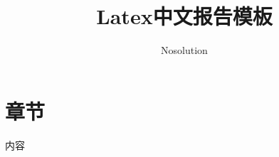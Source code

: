 \documentclass[a4paper]{ctexart} %
\title{Latex中文报告模板}
\author{Nosolution}
\begin{document}
	\maketitle
	
	\section{章节}
	内容
	

	
\end{document}
